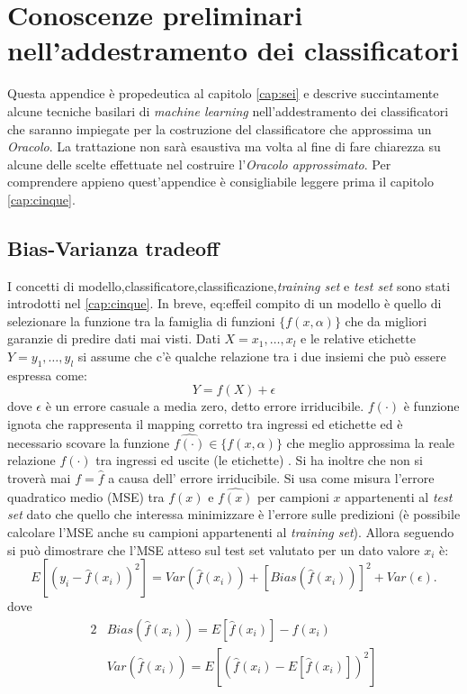  \chapter[Prel. add.  class.]{Conoscenze preliminari nell'addestramento dei classificatori}
\label{app:due}
Questa appendice è propedeutica al capitolo \ref{cap:sei} e descrive succintamente alcune tecniche basilari di \textit{machine learning}  nell'addestramento dei classificatori che saranno impiegate per la costruzione del classificatore che approssima un \textit{Oracolo}. La trattazione non sarà esaustiva ma volta al fine di fare chiarezza su alcune delle scelte effettuate nel costruire l'\textit{Oracolo approssimato}. Per comprendere appieno quest'appendice è consigliabile leggere prima il capitolo \ref{cap:cinque}.

\section{Bias-Varianza tradeoff}
I concetti di modello,classificatore,classificazione,\textit{training set} e \textit{test set} sono stati introdotti nel \ref{cap:cinque}. In breve,  {eq:effe}il compito di un modello è quello di selezionare la funzione tra la famiglia di funzioni $\{f(x,\alpha)\}$ che da migliori garanzie di predire dati mai visti. Dati $X=x_1,\dots,x_l$ e le relative etichette $Y=y_1,\dots,y_l$ si assume che c'è qualche relazione tra i due insiemi che può essere espressa come:
\begin{equation}
Y = f(X) + \epsilon
\end{equation}
dove $\epsilon$ è un errore casuale a media zero, detto errore irriducibile.
$f(\cdot)$ è funzione ignota che rappresenta il mapping corretto tra ingressi ed etichette ed è necessario scovare la funzione $\hat{f(\cdot)} \in \{f(x,\alpha)\}$ che meglio approssima la reale relazione $f(\cdot)$ tra ingressi ed uscite (le etichette) . Si ha inoltre che non si troverà mai $f=\hat{f}$ a causa dell' errore irriducibile. Si usa come misura l'errore quadratico medio (MSE) tra $f(x) \text{ e }\hat{f(x)}$ per campioni $x$ appartenenti al \textit{test set} dato che quello che interessa minimizzare è l'errore sulle predizioni (è possibile calcolare l'MSE anche su campioni appartenenti al \textit{training set}). Allora seguendo \cite{Trevor09} si può dimostrare che l'MSE atteso sul test set valutato per un dato valore $x_i$ è:
\begin{equation}
E[( y_i − \hat{f}(x_i) )^2] = Var( \hat{f}(x_i)) + [Bias( \hat{f}(x_i))]^2 + Var(\epsilon). 
\end{equation}  
 dove 
 \begin{alignat*}{2}
&Bias( \hat{f}(x_i)) = E[\hat{f}(x_i)] - f(x_i) \\
 &Var( \hat{f}(x_i)) = E[(\hat{f}(x_i) - E[\hat{f}(x_i)])^2]
\end{alignat*}

